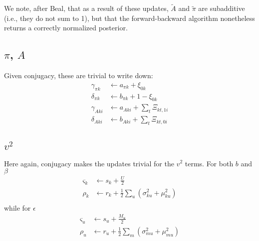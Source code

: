 \documentclass[11pt]{article}
\begin{document}
We note, after Beal, that as a result of these updates, $\tilde{A}$ and $\tilde{\pi}$ are subadditive (i.e., they do not sum to 1), but that the forward-backward algorithm nonetheless returns a correctly normalized posterior.

\subsection{$\pi$, $A$}
Given conjugacy, these are trivial to write down:
\begin{align}
    \gamma_{\pi k} &\leftarrow a_{\pi k} + \xi_{0k} \\
    \delta_{\pi k} &\leftarrow b_{\pi k} + 1 - \xi_{0k} \\
    \gamma_{A ki} &\leftarrow a_{A ki} + \sum_t \Xi_{kt, 1i} \\
    \delta_{A ki} &\leftarrow b_{A ki} + \sum_t \Xi_{kt, 0i} 
\end{align}

\subsection{$v^2$}
Here again, conjugacy makes the updates trivial for the $v^2$ terms. For both $b$ and $\beta$
\begin{align}
    \varsigma_k &\leftarrow s_k + \frac{U}{2} \\
    \rho_k &\leftarrow r_k + \frac{1}{2}\sum_u (\sigma^2_{ku} + \mu^2_{ku}) \\
\end{align}
while for $\epsilon$
\begin{align}
    \varsigma_u &\leftarrow s_u + \frac{M_u}{2} \\
    \rho_u &\leftarrow r_u + \frac{1}{2} \sum_m (\sigma^2_{mu} + \mu^2_{mu})
\end{align}
\end{document}
